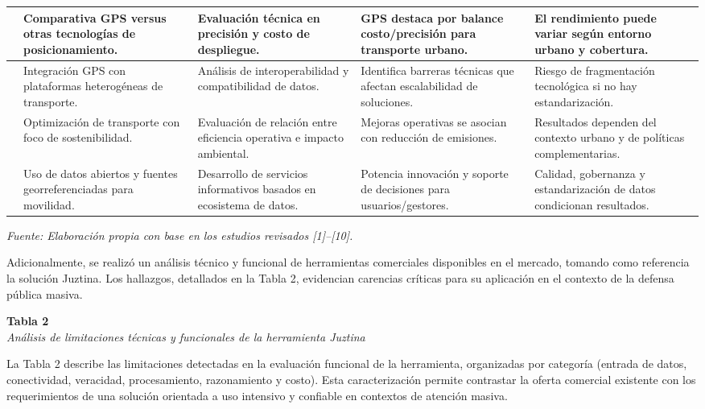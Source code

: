 \begin{longtable}{|p{}|p{}|p{}|p{}|p{}|}
\hline
[7] & Comparativa GPS versus otras tecnologías de posicionamiento. & Evaluación técnica en precisión y costo de despliegue. & GPS destaca por balance costo/precisión para transporte urbano. & El rendimiento puede variar según entorno urbano y cobertura. \\
\hline
[8] & Integración GPS con plataformas heterogéneas de transporte. & Análisis de interoperabilidad y compatibilidad de datos. & Identifica barreras técnicas que afectan escalabilidad de soluciones. & Riesgo de fragmentación tecnológica si no hay estandarización. \\
\hline
[9] & Optimización de transporte con foco de sostenibilidad. & Evaluación de relación entre eficiencia operativa e impacto ambiental. & Mejoras operativas se asocian con reducción de emisiones. & Resultados dependen del contexto urbano y de políticas complementarias. \\
\hline
[10] & Uso de datos abiertos y fuentes georreferenciadas para movilidad. & Desarrollo de servicios informativos basados en ecosistema de datos. & Potencia innovación y soporte de decisiones para usuarios/gestores. & Calidad, gobernanza y estandarización de datos condicionan resultados. \\
\hline
\end{longtable}
\normalsize

\textit{Fuente: Elaboración propia con base en los estudios revisados [1]--[10].}

Adicionalmente, se realizó un análisis técnico y funcional de herramientas comerciales disponibles en el mercado, tomando como referencia la solución Juztina. Los hallazgos, detallados en la Tabla 2, evidencian carencias críticas para su aplicación en el contexto de la defensa pública masiva.

\textbf{Tabla 2}\\
\textit{Análisis de limitaciones técnicas y funcionales de la herramienta Juztina}

La Tabla 2 describe las limitaciones detectadas en la evaluación funcional de la herramienta, organizadas por categoría (entrada de datos, conectividad, veracidad, procesamiento, razonamiento y costo). Esta caracterización permite contrastar la oferta comercial existente con los requerimientos de una solución orientada a uso intensivo y confiable en contextos de atención masiva.

